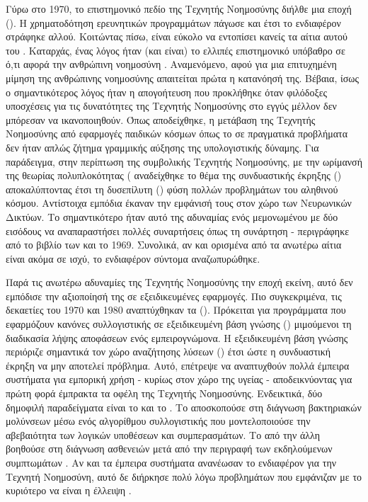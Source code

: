 Γύρω στο 1970, το επιστημονικό πεδίο της Τεχνητής Νοημοσύνης διήλθε μια εποχή  (). Η χρηματοδότηση ερευνητικών προγραμμάτων πάγωσε και έτσι το ενδιαφέρον στράφηκε αλλού. Κοιτώντας πίσω, είναι εύκολο να εντοπίσει κανείς τα αίτια αυτού του . Καταρχάς, ένας λόγος ήταν (και είναι) το ελλιπές επιστημονικό υπόβαθρο σε ό,τι αφορά την ανθρώπινη νοημοσύνη \cite{mitchell2021ai}. Αναμενόμενο, αφού για μια επιτυχημένη μίμηση της ανθρώπινης νοημοσύνης απαιτείται πρώτα η κατανόησή της. Βέβαια, ίσως ο σημαντικότερος λόγος ήταν η απογοήτευση που προκλήθηκε όταν φιλόδοξες υποσχέσεις για τις δυνατότητες της Τεχνητής Νοημοσύνης στο εγγύς μέλλον δεν μπόρεσαν να ικανοποιηθούν. Όπως αποδείχθηκε, η μετάβαση της Τεχνητής Νοημοσύνης από εφαρμογές παιδικών κόσμων όπως το  σε πραγματικά προβλήματα δεν ήταν απλώς ζήτημα γραμμικής αύξησης της υπολογιστικής δύναμης. Για παράδειγμα, στην περίπτωση της συμβολικής Τεχνητής Νοημοσύνης, με την ωρίμανσή της θεωρίας πολυπλοκότητας ( αναδείχθηκε το θέμα της συνδυαστικής έκρηξης () αποκαλύπτοντας έτσι τη δυσεπίλυτη () φύση πολλών προβλημάτων του αληθινού κόσμου. Αντίστοιχα εμπόδια έκαναν την εμφάνισή τους στον χώρο των Νευρωνικών Δικτύων. Το σημαντικότερο ήταν αυτό της αδυναμίας ενός μεμονωμένου  με δύο εισόδους να αναπαραστήσει πολλές συναρτήσεις όπως τη συνάρτηση  \cite{russell2020artificial} - περιγράφηκε από το βιβλίο  των  και  το 1969. Συνολικά, αν και ορισμένα από τα ανωτέρω αίτια είναι ακόμα σε ισχύ, το ενδιαφέρον σύντομα αναζωπυρώθηκε.
\par

Παρά τις ανωτέρω αδυναμίες της Τεχνητής Νοημοσύνης την εποχή εκείνη, αυτό δεν εμπόδισε την αξιοποίησή της σε εξειδικευμένες εφαρμογές. Πιο συγκεκριμένα, τις δεκαετίες του 1970 και 1980 αναπτύχθηκαν τα  (). Πρόκειται για προγράμματα που εφαρμόζουν κανόνες συλλογιστικής σε εξειδικευμένη βάση γνώσης () μιμούμενοι τη διαδικασία λήψης αποφάσεων ενός εμπειρογνώμονα. Η εξειδικευμένη βάση γνώσης περιόριζε σημαντικά τον χώρο αναζήτησης λύσεων () έτσι ώστε η συνδυαστική έκρηξη να μην αποτελεί πρόβλημα. Αυτό, επέτρεψε να αναπτυχθούν πολλά έμπειρα συστήματα για εμπορική χρήση - κυρίως στον χώρο της υγείας - αποδεικνύοντας για πρώτη φορά έμπρακτα τα οφέλη της Τεχνητής Νοημοσύνης. Ενδεικτικά, δύο δημοφιλή παραδείγματα είναι το  και το . Το  αποσκοπούσε στη διάγνωση βακτηριακών μολύνσεων μέσω ενός αλγορίθμου συλλογιστικής που μοντελοποιούσε την αβεβαιότητα των λογικών υποθέσεων και συμπερασμάτων. Το  από την άλλη βοηθούσε στη διάγνωση ασθενειών μετά από την περιγραφή των εκδηλούμενων συμπτωμάτων \cite{todd1992introduction}. Αν και τα έμπειρα συστήματα ανανέωσαν το ενδιαφέρον για την Τεχνητή Νοημοσύνη, αυτό δε διήρκησε πολύ λόγω προβλημάτων που εμφάνιζαν με το κυριότερο να είναι η έλλειψη  \cite{bell1985expert}.
\par

